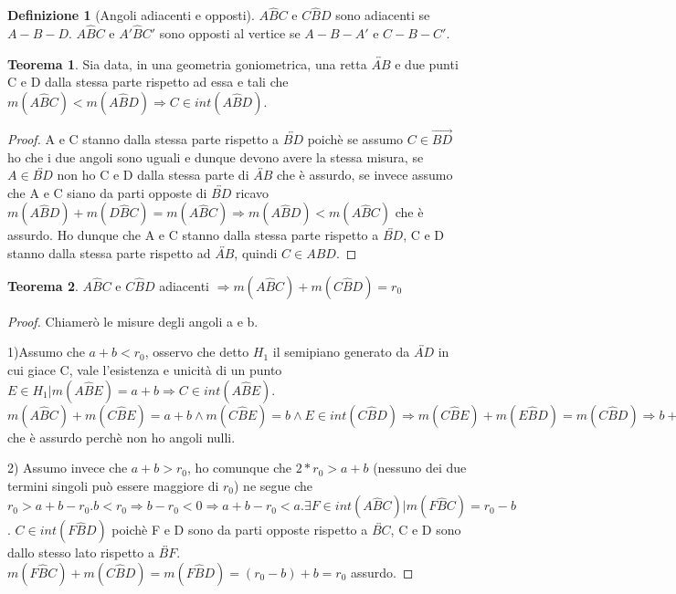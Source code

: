 \documentclass[a4paper,10pt]{article}
\theoremstyle{definition}
\theoremstyle{indentdefinition}
\newtheorem{defn}{Definizione}[section]
\theoremstyle{indentpostulate}
\theoremstyle{indenttheorem}
\newtheorem{thm}{Teorema}[section]
\theoremstyle{myremark}
\theoremstyle{indentgeneral}
\begin{document}
\begin{defn}[Angoli adiacenti e opposti]   $A\hat{B}C$ e $C\hat{B}D$ sono adiacenti se $A-B-D$. $A\hat{B}C$ e $A'\hat{B}C'$ sono opposti al vertice se $A-B-A'$ e $C-B-C'$.   \end{defn} 

\begin{thm}  Sia data, in una geometria goniometrica, una retta $\overleftrightarrow{AB}$ e due punti C e D dalla stessa parte rispetto ad essa e tali che $m(A\hat{B}C)<m(A\hat{B}D)\Rightarrow C \in int(A\hat{B}D)$.
    \end{thm} 

    
\begin{proof}   A e C stanno dalla stessa parte rispetto a $\overleftrightarrow{BD}$ poichè se assumo $C \in \overrightarrow{BD}$ ho che i due angoli sono uguali e dunque devono avere la stessa misura, se $A \in \overleftrightarrow{BD}$ non ho C e D dalla stessa parte di $\overleftrightarrow{AB}$ che è assurdo, se invece assumo che A e C siano da parti opposte di $\overleftrightarrow{BD}$ ricavo $m(A\hat{B}D)+m(D \hat{B}C)=m(A\hat{B}C) \Rightarrow m(A\hat{B}D)<m(A\hat{B}C)$ che è assurdo. Ho dunque che A e C stanno dalla stessa parte rispetto a $\overleftrightarrow{BD}$, C e D stanno dalla stessa parte rispetto ad $\overleftrightarrow{AB}$, quindi $C \in A\hat{B}D$.   \end{proof} 

\begin{thm}  $A\hat{B}C$ e $C\hat{B}D$ adiacenti $\Rightarrow m(A\hat{B}C)+m(C\hat{B}D)=r_0$    \end{thm} 

\begin{proof}  Chiamerò le misure degli angoli a e b. 

1)Assumo che $a+b<r_0$, osservo che detto $ H_1$ il semipiano generato da $\overleftrightarrow{AD}$ in cui giace C, vale l'esistenza e unicità di un punto $E\in H_1|m(A\hat{B}E)=a+b\Rightarrow C \in int(A\hat{B}E)$. $m(A\hat{B}C)+m(C\hat{B}E)=a+b \land m(C\hat{B}E)=b \land E \in int(C\hat{B}D) \Rightarrow m(C\hat{B}E)+m(E\hat{B}D)=m(C\hat{B}D) \Rightarrow b+m(E\hat{B}D)=b$ che è assurdo perchè non ho angoli nulli.

2) Assumo invece che $a+b>r_0$, ho comunque che $2*r_0>a+b$ (nessuno dei due termini singoli può essere maggiore di $r_0$) ne segue che $r_0>a+b-r_0. b<r_0 \Rightarrow b-r_0<0 \Rightarrow a+b-r_0<a. \exists F \in int(A\hat{B}C)| m(F\hat{B}C)=r_0-b$. $C \in int(F\hat{B}D)$ poichè F e D sono da parti opposte rispetto a $\overleftrightarrow{BC}$, C e D sono dallo stesso lato rispetto a $\overleftrightarrow{BF}$.$m(F\hat{B}C)+m(C \hat{B}D)=m(F\hat{B}D)=(r_0-b)+b=r_0$ assurdo.
\end{proof} 
\end{document}
